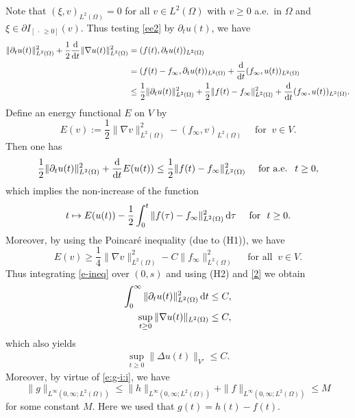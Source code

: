 \documentclass[reqno,10pt]{amsart}
\begin{document}
Note that $(\xi, v)_{L^2(\Omega)} = 0$ for all $v \in L^2(\Omega)$ with
$v \geq 0$ a.e.~in $\Omega$ and $\xi \in \partial {I_{[~\cdot\, \geq 0]}}(v)$. Thus testing
\eqref{ee2} by $\partial_t u(t)$, we have
\begin{align*}
\|\partial_t u(t)\|_{L^2(\Omega)}^2 + \dfrac 1 2 \dfrac{\text{\rm d}}{{\text{\rm d}} t} \|\nabla u(t)\|_{L^2(\Omega)}^2
 &= (f(t), \partial_t u(t))_{L^2(\Omega)}\\
 &= (f(t) - f_\infty, \partial_t u(t))_{L^2(\Omega)} + \dfrac{\text{\rm d}}{{\text{\rm d}} t} (f_\infty, u(t))_{L^2(\Omega)}\\
 &\leq \dfrac 1 2 \|\partial_t u(t)\|_{L^2(\Omega)}^2 + \dfrac 1 2 \|f(t) - f_\infty\|_{L^2(\Omega)}^2
 + \dfrac{\text{\rm d}}{{\text{\rm d}} t} (f_\infty, u(t))_{L^2(\Omega)}.
\end{align*}
Define an energy functional $E$ on $V$ by
$$
E(v) := \dfrac 1 2 \|\nabla v\|_{L^2(\Omega)}^2 - (f_\infty, v)_{L^2(\Omega)} \quad \mbox{ for } \
 v \in V.
$$
Then one has
\begin{equation}\label{e-ineq}
\dfrac 1 2 \|\partial_t u(t)\|_{L^2(\Omega)}^2 + \dfrac{\text{\rm d}}{{\text{\rm d}} t} E(u(t)) 
\leq \dfrac 1 2 \|f(t) - f_\infty\|_{L^2(\Omega)}^2 \quad \mbox{ for a.e. } \ t
 \geq 0,
\end{equation}
which implies the non-increase of the function
$$
t \mapsto E(u(t)) - \dfrac 1 2 \int^t_0 \|f(\tau) -
f_\infty\|_{L^2(\Omega)}^2 \, {\text{\rm d}} \tau
\quad \mbox{ for }  \ t \geq 0.
$$
Moreover, by using the Poincar\'e inequality (due to (H1)), we have
\begin{equation}\label{2}
E(v) \geq \dfrac 1 4 \|\nabla v\|_{L^2(\Omega)}^2 - C \|f_\infty\|_{L^2(\Omega)}^2 \quad \mbox{ for all } \ v \in V.
\end{equation}
Thus integrating \eqref{e-ineq} over $(0,s)$ and using (H2) and
 \eqref{2} we obtain
 \begin{align}
 \int^\infty_0 \|\partial_t u(t)\|_{L^2(\Omega)}^2 \, {\text{\rm d}} t \leq C, \label{e:1}\\
 \sup_{t \geq 0} \|\nabla u(t)\|_{L^2(\Omega)} \leq C, \label{e:2}
\end{align}
which also yields
\begin{align}
 \sup_{t \geq 0} \|\Delta u(t)\|_{V'} \leq C. \label{e:3}
 \end{align}
Moreover, by virtue of \eqref{e:g-i:i}, we have 
\begin{equation}\label{e:4}
 \|g\|_{L^\infty(0,\infty;L^2(\Omega))} 
  \leq  \|h\|_{L^\infty(0,\infty;L^2(\Omega))} + 
  \|f\|_{L^\infty(0,\infty;L^2(\Omega))}
  \leq M
\end{equation}
for some constant $M$.
Here we used that $g(t) = h(t) - f(t)$.
\end{document}
